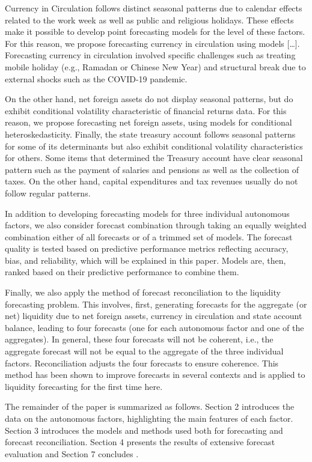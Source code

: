 Currency in  Circulation follows  distinct seasonal  patterns due  to calendar
effects  related   to  the  work  week   as  well  as  public   and  religious
holidays. These effects  make it possible to develop  point forecasting models
for  the level  of  these factors.  For this  reason,  we propose  forecasting
currency in circulation using models  […]. Forecasting currency in circulation
involved specific challenges such as treating mobile holiday (e.g., Ramadan or
Chinese New  Year) and  structural break  due to external  shocks such  as the
COVID-19 pandemic.

On the other hand, net foreign assets do not display seasonal patterns, but do
exhibit conditional  volatility characteristic of financial  returns data. For
this  reason, we  propose forecasting  net  foreign assets,  using models  for
conditional heteroskedasticity.   Finally, the state treasury  account follows
seasonal patterns  for some of  its determinants but also  exhibit conditional
volatility characteristics for others. Some items that determined the Treasury
account  have clear  seasonal  pattern such  as the  payment  of salaries  and
pensions  as well  as the  collection  of taxes.  On the  other hand,  capital
expenditures and tax revenues usually do not follow regular patterns.

In addition to  developing forecasting models for  three individual autonomous
factors,  we also  consider  forecast combination  through  taking an  equally
weighted  combination  either  of  all  forecasts  or  of  a  trimmed  set  of
models. The forecast quality is tested based on predictive performance metrics
reflecting accuracy,  bias, and reliability,  which will be explained  in this
paper.  Models are,  then, ranked  based  on their  predictive performance  to
combine them.

Finally, we also apply the method  of forecast reconciliation to the liquidity
forecasting  problem.  This  involves,  first, generating  forecasts  for  the
aggregate  (or  net)  liquidity  due   to  net  foreign  assets,  currency  in
circulation and state account balance, leading to four forecasts (one for each
autonomous factor and one of the aggregates). In general, these four forecasts
will not be  coherent, i.e., the aggregate  forecast will not be  equal to the
aggregate of  the three  individual factors.  Reconciliation adjusts  the four
forecasts to ensure coherence. This method has been shown to improve forecasts
in several contexts and is applied to liquidity forecasting for the first time
here.


The remainder of the paper is  summarized as follows. Section 2 introduces the
data  on  the autonomous  factors,  highlighting  the  main features  of  each
factor. Section 3 introduces the models  and methods used both for forecasting
and  forecast reconciliation.  Section  4 presents  the  results of  extensive
forecast evaluation and Section 7 concludes .

